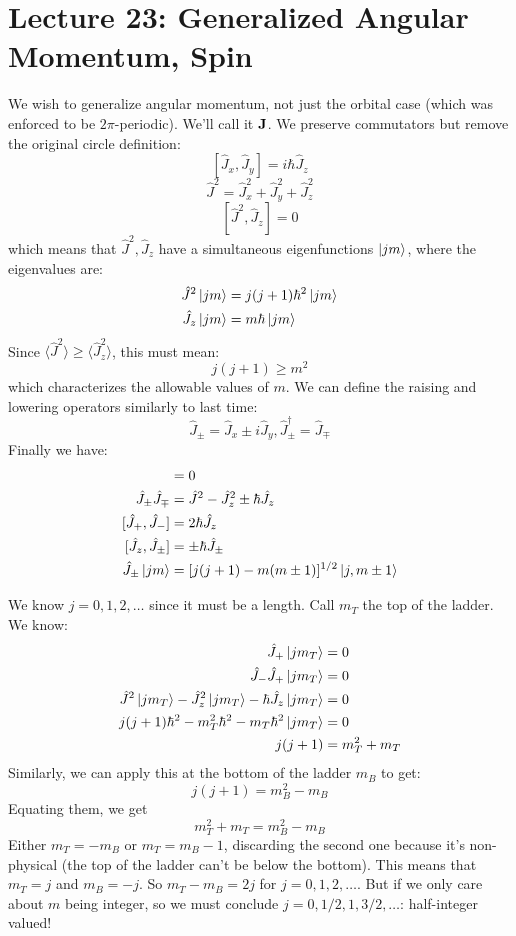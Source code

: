 \section{Lecture 23: Generalized Angular Momentum, Spin} 

We wish to generalize angular momentum, not just the orbital case (which was enforced to be $2\pi$-periodic). We'll call it $\mathbf{J}$.
We preserve commutators but remove the original circle definition:
\[ [\hat{J}_x, \hat{J}_y] = i\hbar \hat{J}_z\]
\[ \hat{J}^2 = \hat{J}_x^2 + \hat{J}_y^2 + \hat{J}_z^2 \]
\[ [\hat{J}^2, \hat{J}_z] = 0 \]
which means that $\hat{J}^2, \hat{J}_z$ have a simultaneous eigenfunctions $\ket{jm}$, where the eigenvalues are:
\begin{align*}
    \hat{J}^2 \ket{jm} &= j(j + 1) \hbar^2 \ket{jm} \\
    \hat{J}_z \ket{jm} &= m\hbar \ket{jm}
\end{align*}
Since $\langle \hat{J}^2 \rangle \geq \langle \hat{J}_z^2 \rangle$, this must mean:
\[ j(j + 1) \geq m^2 \]
which characterizes the allowable values of $m$. We can define the raising and lowering operators similarly to last time:
\[ \hat{J}_{\pm} = \hat{J}_x \pm i \hat{J}_y, \hat{J}_{\pm}^{\dagger} = \hat{J}_{\mp} \]
Finally we have:
\begin{align*}
    [\hat{J}^2, \hat{J}_{\pm}] &= 0 \\
    \hat{J}_{\pm} \hat{J}_{\mp} &= \hat{J}^2 - \hat{J}_z^2 \pm \hbar \hat{J}_z \\
    [\hat{J}_{+}, \hat{J}_-] &= 2 \hbar \hat{J}_z\\
    [\hat{J}_z, \hat{J}_{\pm}] &= \pm \hbar \hat{J}_{\pm} \\
    \hat{J}_{\pm} \ket{jm} &= [j(j + 1) - m(m \pm 1)]^{1/2} \ket{j, m \pm 1}
\end{align*}

We know $j = 0, 1, 2, \dots$ since it must be a length. Call $m_T$ the top of the ladder. We know:
\begin{align*}
    \hat{J}_{+} \ket{j m_T} &= 0 \\
    \hat{J}_{-} \hat{J}_{+} \ket{j m_T} &= 0 \\
    \hat{J}^2 \ket{j m_T} - \hat{J}_z^2 \ket{j m_T} - \hbar \hat{J}_z \ket{j m_T} &= 0 \\
    j(j + 1) \hbar^2 - m_T^2 \hbar^2 - m_T \hbar^2 \ket{j m_T} &= 0 \\
    j(j + 1) &= m_T^2 + m_T
\end{align*}
Similarly, we can apply this at the bottom of the ladder $m_B$ to get:
\[ j(j + 1) = m_B^2 - m_B \]
Equating them, we get
\[ m_T^2 + m_T = m_B^2 - m_B \]
Either $m_T = - m_B$ or $m_T = m_B - 1$, discarding the second one because it's non-physical (the top of the ladder can't be below the bottom).
This means that $m_T = j$ and $m_B = -j$. So $m_T - m_B = 2j$ for $j = 0, 1, 2, \dots$. But if we only care about $m$ being integer,
so we must conclude $j = 0, 1/2, 1, 3/2, \dots$: half-integer valued!

